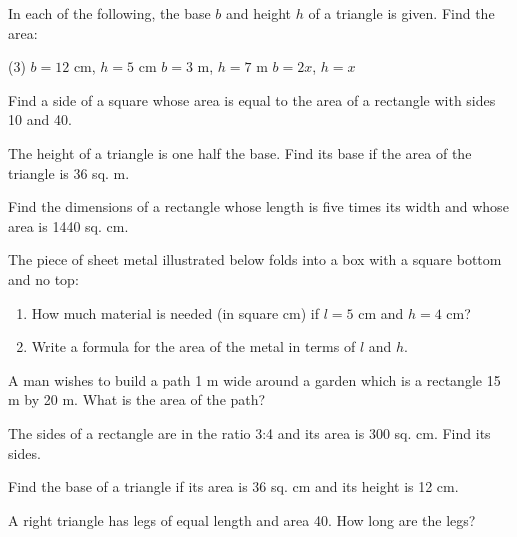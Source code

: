 \documentclass[12pt]{book} %
\begin{document}
\begin{ExerciseList}
\Exercise In each of the following, the base $b$ and height $h$ of a triangle is given. Find the area:
\begin{tasks}(3)
\task[(a)] $b=12$ cm, $h=5$ cm
\task[(b)] $b=3$ m, $h=7$ m
\task[(c)] $b=2x$, $h=x$
\end{tasks}

\Exercise Find a side of a square whose area is equal to the area of a rectangle with sides 10 and 40.

\Exercise The height of a triangle is one half the base. Find its base if the area of the triangle is 36 sq. m.

\Exercise Find the dimensions of a rectangle whose length is five times its width and whose area is 1440 sq. cm.

\Exercise The piece of sheet metal illustrated below folds into a box with a square bottom and no top:


\begin{enumerate}
\item[(a)] How much material is needed (in square cm) if $l=5$ cm and $h=4$ cm?
\item[(b)] Write a formula for the area of the metal in terms of $l$ and $h$.
\end{enumerate}

\Exercise A man wishes to build a path 1 m wide around a garden which is a rectangle 15 m by 20 m. What is the area of the path?

\Exercise The sides of a rectangle are in the ratio 3:4 and its area is 300 sq. cm. Find its sides.

\Exercise Find the base of a triangle if its area is 36 sq. cm and its height is 12 cm.

\Exercise A right triangle has legs of equal length and area 40. How long are the legs?
\end{ExerciseList}
\end{document}
